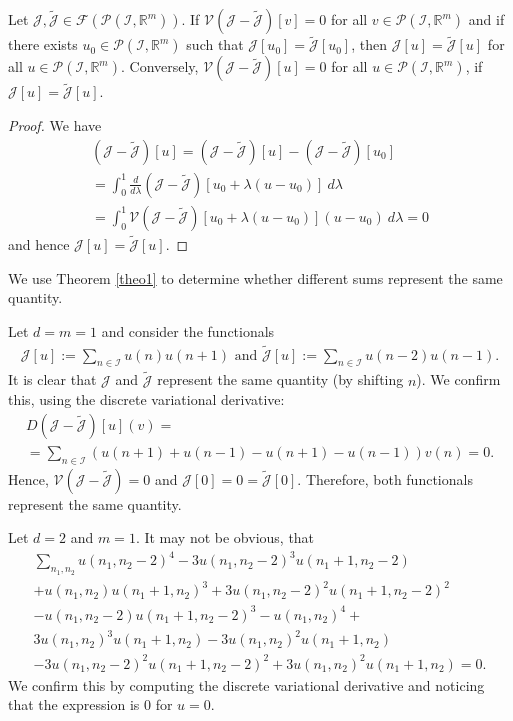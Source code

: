 \documentclass[runningheads]{llncs}
\newcommand{\Rr}{\mathbb{R}}
\newcommand{\1}{\chi}
\newcommand{\Ii}{\mathcal{I}}
\begin{document}
\begin{theorem}\label{theo1}
	Let $\mathcal{J},\tilde{\mathcal{J}}\in \mathcal{F}(\mathcal{P}(\Ii,\Rr^m))$. If $\mathcal{V}(\mathcal{J}-\tilde{\mathcal{J}})[v]=0$ for all $v\in\mathcal{P}(\Ii,\Rr^m)$ and if there exists $u_0\in\mathcal{P}(\Ii,\Rr^m)$ such that $\mathcal{J}[u_0]=\tilde{\mathcal{J}}[u_0]$, then
	$\mathcal{J}[u]=\tilde{\mathcal{J}}[u]$
	for all $u\in\mathcal{P}(\Ii,\Rr^m)$.
	Conversely,
	$\mathcal{V}(\mathcal{J}-\tilde{\mathcal{J}})[u]=0$
	for all $u\in\mathcal{P}(\Ii,\Rr^m)$, if $\mathcal{J}[u]=\tilde{\mathcal{J}}[u]$.
\end{theorem}
\begin{proof}
	We have
	\begin{gather*}
		(\mathcal{J}-\tilde{\mathcal{J}})[u]=(\mathcal{J}-\tilde{\mathcal{J}})[u]-(\mathcal{J}-\tilde{\mathcal{J}})[u_0]\\
		=\int_{0}^{1}\frac{d}{d\lambda}(\mathcal{J}-\tilde{\mathcal{J}})[u_0+\lambda(u-u_0)]\ d\lambda\\
		=\int_{0}^{1}\mathcal{V}(\mathcal{J}-\tilde{\mathcal{J}})[u_0+\lambda(u-u_0)](u-u_0)\ d\lambda=0
	\end{gather*}
	and hence $\mathcal{J}[u]=\tilde{\mathcal{J}}[u]$.
\end{proof}
We use Theorem \ref{theo1} to determine whether different sums represent the same quantity.
\begin{example}
	Let $d=m=1$ and consider the functionals
	\begin{gather*}
		\mathcal{J}[u]:=\sum_{n\in\Ii}u(n)u(n+1)\text{ and }
		\tilde{\mathcal{J}}[u]:=\sum_{n\in\Ii}u(n-2)u(n-1).
	\end{gather*}
	It is clear that $\mathcal{J}$ and $\tilde{\mathcal{J}}$ represent the same quantity (by shifting $n$). We confirm this, using the discrete variational derivative:
	\begin{gather*}
		D(\mathcal{J}-\tilde{\mathcal{J}})[u](v)=\\
		=\sum_{n\in\Ii}(u(n+1)+u(n-1)-u(n+1)-u(n-1))v(n)=0.
	\end{gather*}
	Hence, $\mathcal{V}(\mathcal{J}-\tilde{\mathcal{J}})=0$ and $\mathcal{J}[0]=0=\tilde{\mathcal{J}}[0]$. Therefore, both functionals represent the same quantity.
\end{example}

\begin{example}
	Let $d=2$ and $m=1$. It may not be obvious, that
	\begin{gather*}
		\sum_{n_1,n_2}u(n_1,n_2-2)^4 - 3 u(n_1,n_2-2)^3 u(n_1+1,n_2-2) \\+ 
		u(n_1,n_2) u(n_1+1,n_2)^3 + 3 u(n_1,n_2-2)^2 u(n_1+1,n_2-2)^2\\ -
		u(n_1,n_2-2) u(n_1+1,n_2-2)^3
		- u(n_1, n_2)^4 +\\
		3 u(n_1,n_2)^3 u(n_1+1,n_2)- 3 u(n_1,n_2)^2 u(n_1+1,n_2)\\
		-3 u(n_1,n_2-2)^2 u(n_1+1,n_2-2)^2+ 3 u(n_1,n_2)^2 u(n_1+1,n_2)=0.
	\end{gather*}
	We confirm this by computing the discrete variational derivative and noticing that the expression is $0$ for $u=0$.
\end{example}
\end{document}
